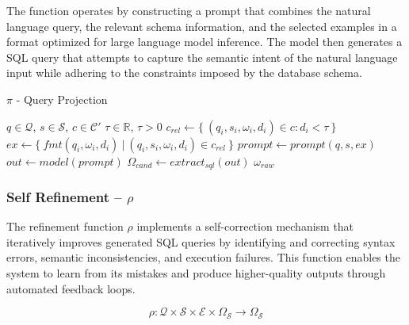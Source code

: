 The function operates by constructing a prompt that combines the natural language
query, the relevant schema information, and the selected examples in a format
optimized for large language model inference. The model then generates a SQL query
that attempts to capture the semantic intent of the natural language input while
adhering to the constraints imposed by the database schema.

\begin{algorithm}
\caption{$\pi$ - Query Projection}\label{algorithms:pi}
\begin{algorithmic}[1]
\Require $q \in \mathcal{Q}$, $s \in \mathcal{S}$, $c \in \mathcal{C}'$
\Require $\tau \in \mathbb{R}$, $\tau > 0$                     
\State $c_{rel} \gets \{~(q_i, s_i, \omega_i, d_i) \in c : d_i < \tau~\}$  
\State $ex \gets \{~fmt(q_i, \omega_i, d_i)~|~(q_i, s_i, \omega_i, d_i) \in c_{rel}~\}$  
\State $prompt \gets prompt(q, s, ex)$                         
\State $out \gets model(prompt)$                               
\State $\Omega_{cand} \gets extract_{sql}(out)$                
                         
                   
        \State \Return $\omega_{raw}$                          
    \EndIf
\EndFor
\end{algorithmic}
\end{algorithm}

\subsubsection{Self Refinement – $\rho$}\label{design:refinement-function}

The refinement function $\rho$ implements a self-correction mechanism that iteratively
improves generated SQL queries by identifying and correcting syntax errors,
semantic inconsistencies, and execution failures. This function enables the system
to learn from its mistakes and produce higher-quality outputs through automated
feedback loops.

$$
\rho: \mathcal{Q} \times \mathcal{S} \times \mathcal{E} \times \Omega_{\mathcal{S}} \rightarrow \Omega_{\mathcal{S}}
$$

\vspace{0.5em}

